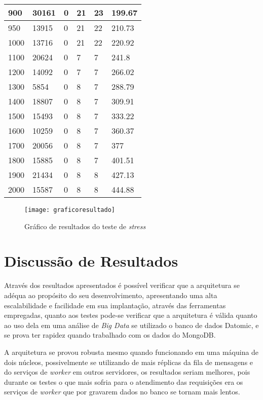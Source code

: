 \begin{table}[h]
\begin{tabular}{ | l | l | l | l | l | l | }
	900 & 30161 & 0 & 21 & 23 & 199.67 \\ \hline
	950 & 13915 & 0 & 21 & 22 & 210.73 \\ \hline
	1000 & 13716 & 0 & 21 & 22 & 220.92 \\ \hline
	1100 & 20624 & 0 & 7 & 7 & 241.8 \\ \hline
	1200 & 14092 & 0 & 7 & 7 & 266.02 \\ \hline
	1300 & 5854 & 0 & 8 & 7 & 288.79 \\ \hline
	1400 & 18807 & 0 & 8 & 7 & 309.91 \\ \hline
	1500 & 15493 & 0 & 8 & 7 & 333.22 \\ \hline
	1600 & 10259 & 0 & 8 & 7 & 360.37 \\ \hline
	1700 & 20056 & 0 & 8 & 7 & 377 \\ \hline
	1800 & 15885 & 0 & 8 & 7 & 401.51 \\ \hline
	1900 & 21434 & 0 & 8 & 8 & 427.13 \\ \hline
	2000 & 15587 & 0 & 8 & 8 & 444.88 \\ \hline
\end{tabular}
\end{table}

\begin{figure}[!h]
\caption{\label{fig:prototipo} Gráfico de resultados do teste de \textit{stress}}
\begin{center}
\texttt{[image: graficoresultado]}
\end{center}
\end{figure}


\section{Discussão de Resultados}
\label{sec:discussãoresultados}
Através dos resultados apresentados é possível verificar que a arquitetura se adéqua ao propósito do seu desenvolvimento, apresentando uma alta escalabilidade e facilidade em sua implantação, através das ferramentas empregadas, quanto aos testes pode-se verificar que a arquitetura é válida quanto ao uso dela em uma análise de \textit{Big Data} se utilizado o banco de dados Datomic, e se prova ter rapidez quando trabalhado com os dados do MongoDB. 

A arquitetura se provou robusta mesmo quando funcionando em uma máquina de dois núcleos, possivelmente se utilizando de mais réplicas da fila de mensagens e do serviços de \textit{worker} em outros servidores,  os resultados seriam melhores, pois durante os testes o que mais sofria para o atendimento das requisições era os serviços de \textit{worker} que por gravarem dados no banco se tornam mais lentos.

